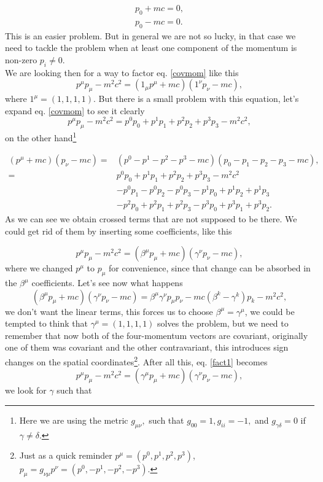 \begin{eqnarray}
  p_0 + mc = 0,\\
  p_0 - mc = 0.
\end{eqnarray}
This is an easier problem. But in general we are not so lucky, in that case we need to tackle the problem when at least one component of the momentum is non-zero $p_i \neq 0$.\\

We are looking then for a way to factor eq. \ref{covmom} like this
\begin{equation*}
  p^\mu p_\mu - m^2c^2 = (1_\mu p^\mu+mc)(1^\nu p_\nu -mc),
\end{equation*}
where $1^\mu = (1,1,1,1)$. But there is a small problem with this equation, let's expand eq. \ref{covmom} to see it clearly
\begin{equation*}
  p^\mu p_\mu - m^2c^2 = p^0p_0 + p^1p_1 + p^2p_2 + p^3p_3 - m^2c^2,
\end{equation*}
on the other hand\footnote{Here we are using the metric $g_{\mu\nu},$ such that $g_{00} = 1, g_{ii} = -1,$ and $g_{\gamma \delta} = 0$ if $\gamma \neq \delta$.}

\begin{equation*}
  \begin{aligned}
    (p^\mu+mc)(p_\nu -mc) = &(p^0 - p^1 - p^2 - p^3 - mc)(p_0 - p_1 - p_2 - p_3 - mc), \\
    = &p^0p_0 + p^1p_1 + p^2p_2 + p^3p_3 - m^2c^2 \\
    &- p^0p_1 - p^0p_2 - p^0p_3 - p^1p_0 + p^1p_2 + p^1p_3 \\
    &- p^2p_0 + p^2p_1 + p^2p_3 - p^3p_0 + p^3p_1 + p^3p_2.
  \end{aligned}
\end{equation*}
As we can see we obtain crossed terms that are not supposed to be there. We could get rid of them by inserting some coefficients, like this

\begin{equation}
  p^\mu p_\mu - m^2c^2 = (\beta^\mu p_\mu + mc)(\gamma^\nu p_\nu -mc),
  \label{fact1}
\end{equation}
where we changed $p^\mu$ to $p_\mu$ for convenience, since that change can be absorbed in the $\beta^\mu$ coefficients. Let's see now what happens
\begin{equation*}
  (\beta^\mu p_\mu + mc)(\gamma^\nu p_\nu -mc) = \beta^\mu\gamma^\nu p_\mu p _\nu - mc(\beta^k - \gamma^k)p_k - m^2c^2,
\end{equation*}
we don't want the linear terms, this forces us to choose $\beta^\mu = \gamma^\mu$, we could be tempted to think that $\gamma^\mu = (1,1,1,1)$ solves the problem, but we need to remember that now both of the four-momentum vectors are covariant, originally one of them was covariant and the other contravariant, this introduces sign changes on the spatial coordinates\footnote{Just as a quick reminder $p^\mu = (p^0, p^1, p^2, p^3)$, $p_\mu = g_{\nu\mu}p^\nu = (p^0,-p^1,-p^2,-p^3)$.}. After all this, eq. \ref{fact1} becomes
\begin{equation}
  p^\mu p_\mu - m^2c^2 = (\gamma^\mu p_\mu + mc)(\gamma^\nu p_\nu -mc),
  \label{fact2}
\end{equation}
we look for $\gamma$ such that

